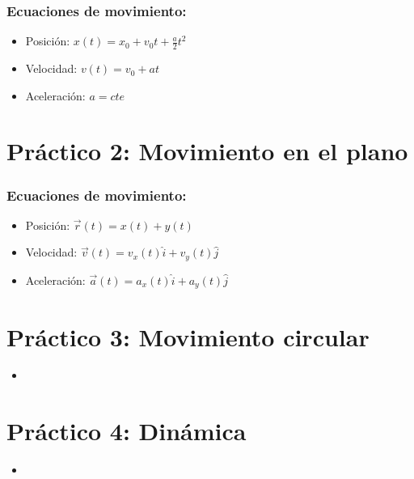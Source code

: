 \documentclass[11pt,a4paper]{article}
\begin{document}
		\subsubsection*{Ecuaciones de movimiento:}
			\begin{multicols}{3}
				\begin{itemize}
					\item Posición: $x(t) = x_{0} + v_{0} t + \frac{a}{2} t^{2}$
					\item Velocidad: $v(t) = v_{0} + at$
					\item Aceleración: $a = cte$
				\end{itemize}
			\end{multicols}

	\section*{Práctico 2: Movimiento en el plano}
		\subsubsection*{Ecuaciones de movimiento:}
			\begin{itemize}
				\item Posición: $\vec{r}(t) = x(t) + y(t)$
				\item Velocidad: $\vec{v}(t) = v_{x}(t) \hat{i} + v_{y}(t) \hat{j}$
				\item Aceleración: $\vec{a}(t) = a_{x}(t) \hat{i} + a_{y}(t) \hat{j}$
			\end{itemize}

	\section*{Práctico 3: Movimiento circular}
		\begin{itemize}
			\item
		\end{itemize}

	\section*{Práctico 4: Dinámica}
		\begin{itemize}
			\item
		\end{itemize}
\end{document}
